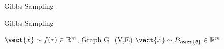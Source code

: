 \begin{algo}{Gibbs Sampling~\cite{yildirim2012bayesian}}
    \begin{algorithm}[H]
        \caption{Gibbs Sampling}
        \begin{algorithmic}
            \label{alg:gibbs}
            \REQUIRE $\vect{x} \sim f(\tau) \in \mathbb{R}^m$, Graph G=(V,E)
            \ENSURE  $\vect{x} \sim P_{\vect{\theta}}\in \mathbb{R}^m$ \\
                \ENDFOR
            \ENDFOR
        \end{algorithmic}
    \end{algorithm}
\end{algo}
